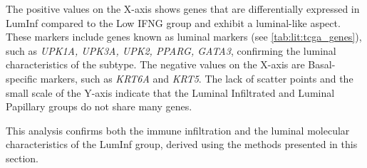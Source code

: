 The positive values on the X-axis shows genes that are differentially expressed in LumInf compared to the Low IFNG group and exhibit a luminal-like aspect. These markers include genes known as luminal markers (see \cref{tab:lit:tcga_genes}), such as \textit{UPK1A, UPK3A, UPK2, PPARG, GATA3}, confirming the luminal characteristics of the subtype. The negative values on the X-axis are Basal-specific markers, such as \textit{KRT6A} and \textit{KRT5}. The lack of scatter points and the small scale of the Y-axis indicate that the Luminal Infiltrated and Luminal Papillary groups do not share many genes.

This analysis confirms both the immune infiltration and the luminal molecular characteristics of the LumInf group, derived using the methods presented in this section.


